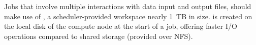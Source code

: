 \noindent Jobs that involve multiple interactions with data input and output files, should make use of ,
a scheduler-provided workspace nearly 1~TB in size.
 is created on the local disk of the compute node at the start of a job, offering faster I/O operations
compared to shared storage (provided over NFS).



